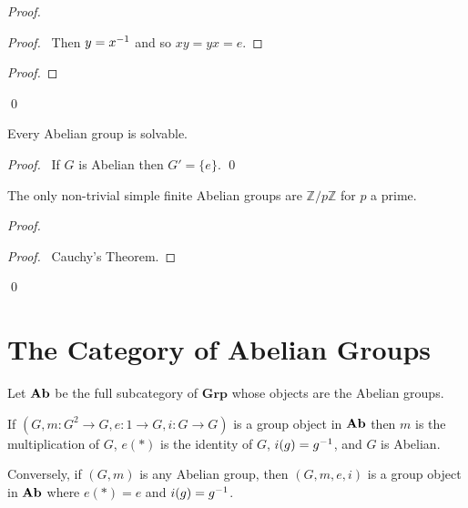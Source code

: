 \begin{proof}
\pf
{}
\begin{proof}
	\pf\ Then $y = {x}^{-1}$ and so $xy = yx = e$.
\end{proof}
\begin{proof}
\end{proof}
\qed
\end{proof}

\begin{prop}
Every Abelian group is solvable.
\end{prop}

\begin{proof}
\pf\ If $G$ is Abelian then $G' = \{e\}$. \qed
\end{proof}

\begin{prop}
The only non-trivial simple finite Abelian groups are $\mathbb{Z} / p \mathbb{Z}$ for $p$ a prime.
\end{prop}

\begin{proof}
\pf
{}
\begin{proof}
	\pf\ Cauchy's Theorem.
\end{proof}
\qed
\end{proof}

\section{The Category of Abelian Groups}

\begin{df}
    Let $\mathbf{Ab}$ be the full subcategory of $\mathbf{Grp}$ whose objects are the Abelian groups.
\end{df}

\begin{prop}
If $(G, m : G^2 \rightarrow G, e : 1 \rightarrow G, i : G \rightarrow G)$ is a group object in $\mathbf{Ab}$ then $m$ is the multiplication of $G$, $e(*)$ is the identity of $G$, $i(g) = {g}^{-1}$, and $G$ is Abelian.

Conversely, if $(G, m)$ is any Abelian group, then $(G,m,e,i)$ is a group object in $\mathbf{Ab}$ where $e(*) = e$ and $i(g) = {g}^{-1}$.
\end{prop}

